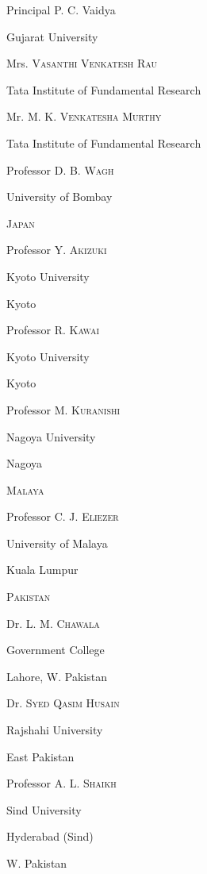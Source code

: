 \bigskip

Principal P. C. Vaidya

Gujarat University

\bigskip

Mrs. \textsc{Vasanthi Venkatesh Rau}

Tata Institute of Fundamental Research

\bigskip

Mr. M. K. \textsc{Venkatesha Murthy}

Tata Institute of Fundamental Research

\bigskip

Professor D. B. \textsc{Wagh}

University of Bombay

\medskip
\noindent
\textsc{Japan}

\smallskip

Professor Y. \textsc{Akizuki}

Kyoto University

Kyoto

\bigskip

Professor R. \textsc{Kawai}

Kyoto University

Kyoto

\eject

 
Professor M. \textsc{Kuranishi}

Nagoya University

Nagoya

\medskip
\noindent
\textsc{Malaya}

\smallskip
Professor C. J. \textsc{Eliezer}

University of Malaya

Kuala Lumpur

\medskip
\noindent
\textsc{Pakistan}

\smallskip
Dr. L. M. \textsc{Chawala}
 
Government College

Lahore, W. Pakistan

\bigskip

Dr. \textsc{Syed Qasim Husain}

Rajshahi University 

East Pakistan

\bigskip

Professor A. L. \textsc{Shaikh}

Sind University

Hyderabad (Sind)

W. Pakistan

